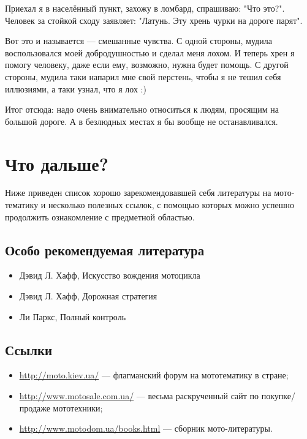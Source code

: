 \documentclass[12pt,a4paper]{article}
\begin{document}
Приехал я в населённый пункт, захожу в ломбард, спрашиваю: "Что это?".
Человек за стойкой сходу заявляет: "Латунь. Эту хрень чурки на дороге
парят".

Вот это и называется --- смешанные чувства. С одной стороны, мудила
воспользовался моей добродушностью и сделал меня лохом. И теперь хрен
я помогу человеку, даже если ему, возможно, нужна будет помощь. С другой
стороны, мудила таки напарил мне свой перстень, чтобы я не тешил себя
иллюзиями, а таки узнал, что я лох :)

Итог отсюда: надо очень внимательно относиться к людям, просящим на
большой дороге. А в безлюдных местах я бы вообще не останавливался.

\clearpage

\section{Что дальше?}

Ниже приведен список хорошо зарекомендовавшей себя литературы на
мото-тематику и несколько полезных ссылок, с помощью которых можно
успешно продолжить ознакомление с предметной областью.

\subsection{Особо рекомендуемая литература}

\begin{itemize}
\item Дэвид Л. Хафф, Искусство вождения мотоцикла
\item Дэвид Л. Хафф, Дорожная стратегия
\item Ли Паркс, Полный контроль
\end{itemize}

\subsection{Ссылки}

\begin{itemize}
\item \url{http://moto.kiev.ua/} --- флагманский форум на мототематику в стране;
\item \url{http://www.motosale.com.ua/} --- весьма раскрученный сайт по покупке/продаже мототехники;
\item \url{http://www.motodom.ua/books.html} --- сборник мото-литературы.
\end{itemize}
\end{document}

